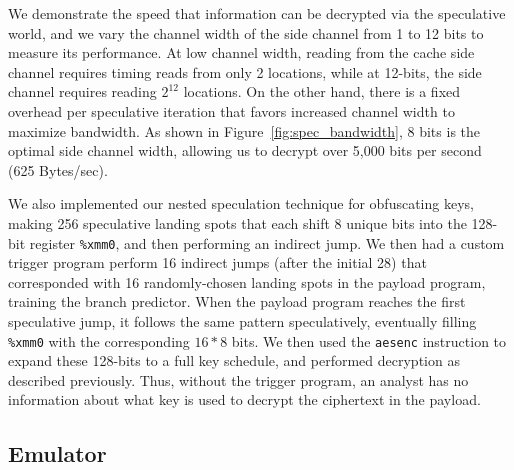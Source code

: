 We demonstrate the speed that information can be decrypted via the speculative
world, and we vary the channel width of the side channel from 1 to 12 bits to
measure its performance. At low channel width, reading from the cache side
channel requires timing reads from only 2 locations, while at 12-bits, the side
channel requires reading $2^{12}$ locations. On the other hand, there is a fixed
overhead per speculative iteration that favors increased channel width to maximize
bandwidth. As shown in Figure~\ref{fig:spec_bandwidth}, 8 bits is the optimal
side channel width, allowing us to decrypt over 5,000 bits per second (625
Bytes/sec).


\smallskip

We also implemented our nested speculation technique for obfuscating keys,
making 256 speculative landing spots that each
shift 8 unique bits into the 128-bit register \texttt{\%xmm0}, and then
performing an indirect jump. We then had a custom trigger program perform 16
indirect jumps (after the initial 28) that corresponded with 16 randomly-chosen landing spots in the
payload program, training the branch predictor. When the payload program reaches the
first speculative jump, it follows the same pattern speculatively, 
eventually filling
\texttt{\%xmm0} with the corresponding $16*8$ bits. We then used
the \texttt{aesenc} instruction to expand these 128-bits to a full
key schedule, and performed decryption as described previously. Thus, without
the trigger program, an analyst has no information about what key is used to
decrypt the ciphertext in the payload.




\FigSpecBandwidth

\subsection{Emulator}
\label{subsec:spasm}


